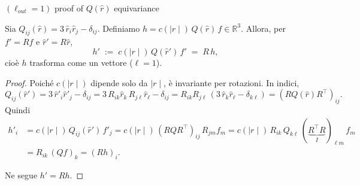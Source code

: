 \documentclass[aspectratio=64,8pt]{beamer}
\begin{document}
\begin{frame}{$(\ell_{out}=1)$ proof of $Q(\hat{r})$ equivariance }
\begin{lemma}
Sia $Q_{ij}(\hat r)=3\,\hat r_i \hat r_j - \delta_{ij}$. Definiamo $h=c(\mid r \mid)\,Q(\hat r)\,f\in\mathbb R^3$.
Allora, per $f' = R f$ e $\hat r' = R \hat r$,
\[
h' \;:=\; c(\mid r \mid)\,Q(\hat r')\,f' \;=\; R\,h,
\]
cio\`e $h$ trasforma come un vettore ($\ell=1$).
\end{lemma}

\begin{proof}
Poich\'e $c(\mid r \mid)$ dipende solo da $\mid r \mid$, \`e invariante per rotazioni. In indici,
\[
Q_{ij}(\hat r') = 3\,\hat r'_i \hat r'_j - \delta_{ij}
= 3\,R_{ik}\hat r_k\, R_{j\ell}\hat r_\ell - \delta_{ij}
= R_{ik} R_{j\ell}\,(3\,\hat r_k \hat r_\ell - \delta_{k\ell})
= (R Q(\hat r) R^\top)_{ij}.
\]
Quindi
\begin{align}\nonumber
h'_i
&= c(\mid r \mid)\,Q_{ij}(\hat r')\,f'_j
= c(\mid r \mid)\,(R Q R^\top)_{ij}\,R_{jm} f_m
= c(\mid r \mid)\,R_{ik}\,Q_{k\ell}\,(\underbrace{R^\top R}_{I})_{\ell m}\,f_m
\\ &=R_{ik}\,(Q f)_k
= (R h)_i.\nonumber
\end{align}

Ne segue $h' = R h$.
\end{proof}

    
\end{frame}
\end{document}
